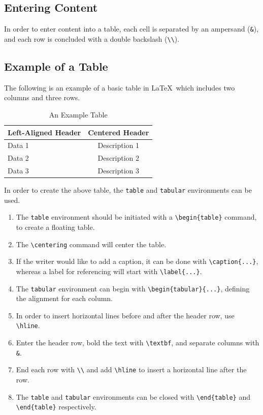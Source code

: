 \documentclass[12pt,journal,compsoc]{IEEEtran}
\begin{document}
\subsection{Entering Content}

In order to enter content into a table, each cell is separated by an ampersand (\texttt{\&}), and each row is concluded with a double backslash (\texttt{\textbackslash\textbackslash}). 

\subsection{Example of a Table}

The following is an example of a basic table in \LaTeX\ which includes two columns and three rows. 

\begin{table}[h]
\centering
\caption{An Example Table}
\label{tab:example}
\begin{tabular}{|l|c|}
\hline
\textbf{Left-Aligned Header} & \textbf{Centered Header} \\ \hline
Data 1                       & Description 1            \\ \hline
Data 2                       & Description 2            \\ \hline
Data 3                       & Description 3            \\ \hline
\end{tabular}
\end{table}

In order to create the above table, the \texttt{table} and \texttt{tabular} environments can be used.  

\begin{enumerate}
    \item The \texttt{table} environment should be initiated with a \texttt{\textbackslash begin\{table\}} command, to create a floating table.
    \item The \texttt{\textbackslash centering} command will center the table. 
    \item If the writer would like to add a caption, it can be done with \texttt{\textbackslash caption\{...\}}, whereas a label for referencing will start with \texttt{\textbackslash label\{...\}}.
    \item The \texttt{tabular} environment can begin with \texttt{\textbackslash begin\{tabular\}\{...\}}, defining the alignment for each column.  
    \item In order to insert horizontal lines before and after the header row, use \texttt{\textbackslash hline}. 
    \item Enter the header row, bold the text with \texttt{\textbackslash textbf}, and separate columns with \texttt{\&}.
    \item End each row with \texttt{\textbackslash\textbackslash} and add \texttt{\textbackslash hline} to insert a horizontal line after the row.
    \item The \texttt{table} and \texttt{tabular} environments can be closed with \texttt{\textbackslash end\{table\}} and \texttt{\textbackslash end\{table\}} respectively.
\end{enumerate}
\end{document}
